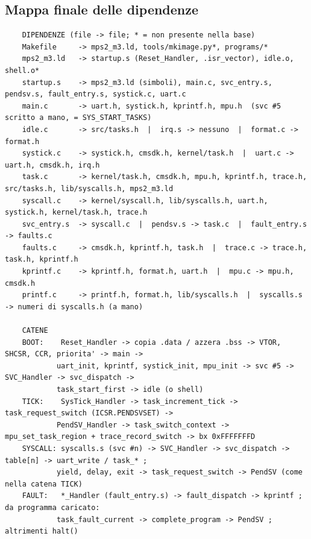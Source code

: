 \subsection{Mappa finale delle dipendenze}

{\footnotesize
\begin{verbatim}
    DIPENDENZE (file -> file; * = non presente nella base)
    Makefile     -> mps2_m3.ld, tools/mkimage.py*, programs/*
    mps2_m3.ld   -> startup.s (Reset_Handler, .isr_vector), idle.o, shell.o*
    startup.s    -> mps2_m3.ld (simboli), main.c, svc_entry.s, pendsv.s, fault_entry.s, systick.c, uart.c
    main.c       -> uart.h, systick.h, kprintf.h, mpu.h  (svc #5 scritto a mano, = SYS_START_TASKS)
    idle.c       -> src/tasks.h  |  irq.s -> nessuno  |  format.c -> format.h
    systick.c    -> systick.h, cmsdk.h, kernel/task.h  |  uart.c -> uart.h, cmsdk.h, irq.h
    task.c       -> kernel/task.h, cmsdk.h, mpu.h, kprintf.h, trace.h, src/tasks.h, lib/syscalls.h, mps2_m3.ld
    syscall.c    -> kernel/syscall.h, lib/syscalls.h, uart.h, systick.h, kernel/task.h, trace.h
    svc_entry.s  -> syscall.c  |  pendsv.s -> task.c  |  fault_entry.s -> faults.c
    faults.c     -> cmsdk.h, kprintf.h, task.h  |  trace.c -> trace.h, task.h, kprintf.h
    kprintf.c    -> kprintf.h, format.h, uart.h  |  mpu.c -> mpu.h, cmsdk.h
    printf.c     -> printf.h, format.h, lib/syscalls.h  |  syscalls.s -> numeri di syscalls.h (a mano)

    CATENE
    BOOT:    Reset_Handler -> copia .data / azzera .bss -> VTOR, SHCSR, CCR, priorita' -> main ->
            uart_init, kprintf, systick_init, mpu_init -> svc #5 -> SVC_Handler -> svc_dispatch ->
            task_start_first -> idle (o shell)
    TICK:    SysTick_Handler -> task_increment_tick -> task_request_switch (ICSR.PENDSVSET) ->
            PendSV_Handler -> task_switch_context -> mpu_set_task_region + trace_record_switch -> bx 0xFFFFFFFD
    SYSCALL: syscalls.s (svc #n) -> SVC_Handler -> svc_dispatch -> table[n] -> uart_write / task_* ;
            yield, delay, exit -> task_request_switch -> PendSV (come nella catena TICK)
    FAULT:   *_Handler (fault_entry.s) -> fault_dispatch -> kprintf ; da programma caricato:
            task_fault_current -> complete_program -> PendSV ; altrimenti halt()
\end{verbatim}
}